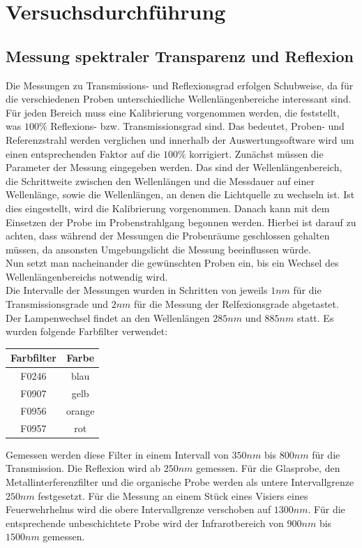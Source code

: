 \section{Versuchsdurchführung}
	\subsection{Messung spektraler Transparenz und Reflexion} \label{sec:shimadzu}
    	Die Messungen zu Transmissions- und Reflexionsgrad erfolgen Schubweise, da für die verschiedenen Proben unterschiedliche Wellenlängenbereiche interessant sind. Für jeden Bereich muss eine Kalibrierung vorgenommen werden, die feststellt, was $ 100\unit{\%} $ Reflexions- bzw. Transmissionsgrad sind. Das bedeutet, Proben- und Referenzstrahl werden verglichen und innerhalb der Auswertungsoftware wird um einen entsprechenden Faktor auf die $100\unit{\%}$ korrigiert. 
        Zunächst müssen die Parameter der Messung eingegeben werden. Das sind der Wellenlängenbereich, die Schrittweite zwischen den Wellenlängen und die Messdauer auf einer Wellenlänge, sowie die Wellenlängen, an denen die Lichtquelle zu wechseln ist. Ist dies eingestellt, wird die Kalibrierung vorgenommen. Danach kann mit dem Einsetzen der Probe im Probenstrahlgang begonnen werden. Hierbei ist darauf zu achten, dass während der Messungen die Probenräume geschlossen gehalten müssen, da ansonsten Umgebungslicht die Messung beeinflussen würde.\\
        Nun setzt man nacheinander die gewünschten Proben ein, bis ein Wechsel des Wellenlängenbereichs notwendig wird.\\
        Die Intervalle der Messungen wurden in Schritten von jeweils $1\unit{nm}$ für die Transmissionsgrade und $2\unit{nm}$ für die Messung der Relfexionsgrade abgetastet. Der Lampenwechsel findet an den Wellenlängen $285\unit{nm} \text{ und } 885\unit{nm}$ statt.
        Es wurden folgende Farbfilter verwendet:
        \begin{table}
            \centering
            \begin{tabular}{c|c}
                     \textbf{Farbfilter} & \textbf{Farbe} \\ 
            \hline F0246 & blau \\ 
                   F0907 & gelb \\
                   F0956 & orange \\
                   F0957 & rot  \\
            \end{tabular} 
        \end{table}
        Gemessen werden diese Filter in einem Intervall von $350\unit{nm}$ bis $800\unit{nm}$ für die Transmission. Die Reflexion wird ab $250\unit{nm}$ gemessen.
        Für die Glasprobe, den Metallinterferenzfilter und die organische Probe werden als untere Intervallgrenze $250\unit{nm}$ festgesetzt. Für die Messung an einem Stück eines Visiers eines Feuerwehrhelms wird die obere Intervallgrenze verschoben auf $1300\unit{nm}$. Für die entsprechende unbeschichtete Probe wird der Infrarotbereich von $900\unit{nm}$ bis $1500\unit{nm}$ gemessen.
	
